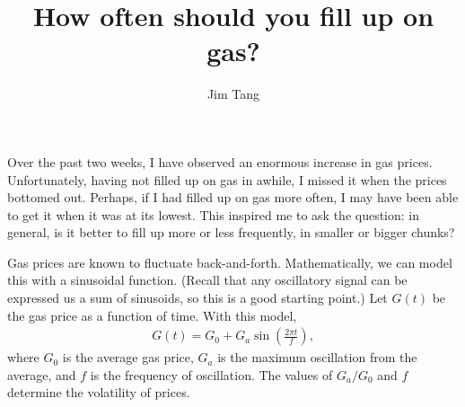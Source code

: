 \documentclass[11pt]{article}
\title{How often should you fill up on gas?}
\author{Jim Tang}
\begin{document}
  \maketitle

Over the past two weeks, I have observed an enormous increase in gas prices. Unfortunately, having not filled up on gas in awhile, I missed it when the prices bottomed out. Perhaps, if I had filled up on gas more often, I may have been able to get it when it was at its lowest. This inspired me to ask the question: in general, is it better to fill up more or less frequently, in smaller or bigger chunks?

\par Gas prices are known to fluctuate back-and-forth. Mathematically, we can model this with a sinusoidal function. (Recall that any oscillatory signal can be expressed us a sum of sinusoids, so this is a good starting point.) Let $G(t)$ be the gas price as a function of time. With this model,
\begin{align}
G(t) = G_0 + G_a \sin \left( \frac{2 \pi t}{f}\right) \label{eq:gas_prices},
\end{align}
where $G_0$ is the average gas price, $G_a$ is the maximum oscillation from the average, and $f$ is the frequency of oscillation. The values of $G_a / G_0$ and $f$ determine the volatility of prices.
\end{document}
